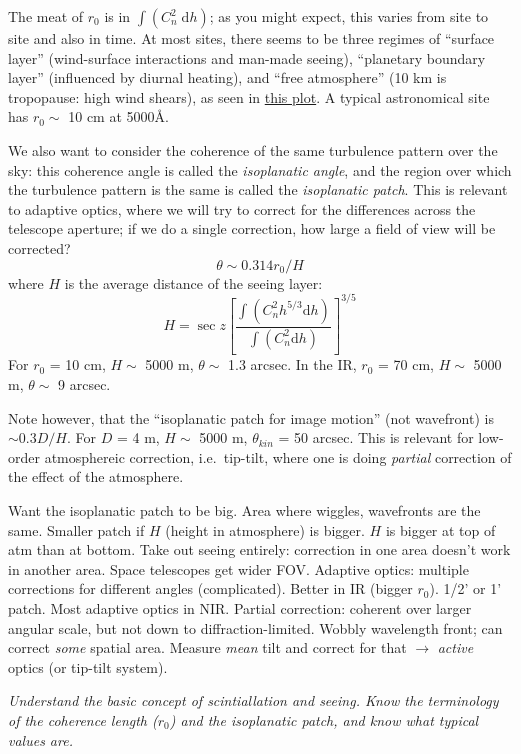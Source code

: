 \documentclass[12pt]{article}
\newcommand{\mynotes}[1]{\textcolor{myBlue}{#1}}
\newcommand{\test}[1]{%
    \begin{center}
        {\parbox{0.9\textwidth}{\textit{\small#1}}}
    \end{center}}
\newcommand{\dd}{\;\mathrm{d}}
\begin{document}
The meat of $r_{0}$ is in $\int\left(C_{n}^{2}\dd{h} \right)$;
as you might expect, this varies from site to site and also in time.
At most sites, there seems to be three regimes of ``surface layer''
(wind-surface interactions and man-made seeing),
``planetary boundary layer'' (influenced by diurnal heating), and
``free atmosphere'' (10 km is tropopause: high wind shears),
as seen in \href{http://astronomy.nmsu.edu/holtz/a535/html/diagrams/a535/beckers2.htm}
{this plot}. A typical astronomical site has $r_{0} \sim$ 10 cm at 5000\AA{}.

We also want to consider the coherence of the same turbulence pattern over the
sky: this coherence angle is called the \textit{isoplanatic angle}, and the
region over which the turbulence pattern is the same is called the
\textit{isoplanatic patch}. This is relevant to adaptive optics, where we will
try to correct for the differences across the telescope aperture; if we do a
single correction, how large a field of view will be corrected?
\[
    \theta \sim 0.314r_{0}/H
    \]
where $H$ is the average distance of the seeing layer:
\[
    H = \sec z \left[ \frac{\int \left( C_{n}^{2}h^{5/3}\textrm{d}h\right)}
    {\int\left(C_{n}^{2}\textrm{d}h\right)}
    \right]^{3/5}
\]
For $r_{0}$ = 10 cm, $H \sim$ 5000 m, $\theta \sim$ 1.3 arcsec.
In the IR, $r_{0}$ = 70 cm, $H \sim$ 5000 m, $\theta \sim$ 9 arcsec.

Note however, that the ``isoplanatic patch for image motion'' (not wavefront)
is $\sim 0.3 D/H$. For $D$ = 4 m, $H \sim$ 5000 m, $\theta_{kin}$ = 50 arcsec.
This is relevant for low-order atmosphereic correction, i.e.\ tip-tilt, where
one is doing \emph{partial} correction of the effect of the atmosphere.

\mynotes{Want the isoplanatic patch to be big. Area where wiggles, wavefronts
are the same. Smaller patch if $H$ (height in atmosphere) is bigger. $H$ is
bigger at top of atm than at bottom. Take out seeing entirely: correction in
one area doesn't work in another area. Space telescopes get wider FOV\@.
Adaptive optics: multiple corrections for different angles (complicated).
Better in IR (bigger $r_{0}$). 1/2' or 1' patch. Most adaptive optics in NIR\@.
Partial correction: coherent over larger angular scale, but not down to
diffraction-limited. Wobbly wavelength front; can correct \emph{some} spatial
area. Measure \emph{mean} tilt and correct for that $\rightarrow$ \emph{active}
optics (or tip-tilt system)}.

\test{Understand the basic concept of scintiallation and seeing. Know the
terminology of the coherence length ($r_{0}$) and the isoplanatic patch,
and know what typical values are.}
\end{document}
